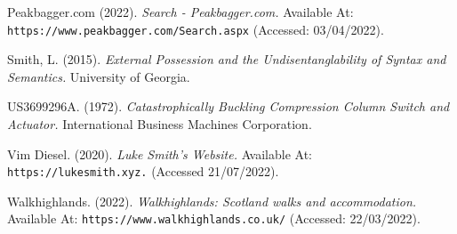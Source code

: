 \documentclass[11pt, english]{article}
\begin{document}
\begin{thebibliography}{9}
	\bibitem{}
		Peakbagger.com (2022).
		\textsl{Search - Peakbagger.com.}
		Available At:
		\texttt{https://www.peakbagger.com/Search.aspx}
		(Accessed: 03/04/2022).

	\bibitem{}
		Smith, L. (2015).
		\textsl{External Possession and the Undisentanglability of Syntax and Semantics.}
		University of Georgia.

	\bibitem{}
		US3699296A. (1972).
		\textsl{Catastrophically Buckling Compression Column Switch and Actuator.}
		International Business Machines Corporation.

	\bibitem{}
		Vim Diesel. (2020).
		\textsl{Luke Smith's Website.}
		Available At:
		\texttt{https://lukesmith.xyz.}
		(Accessed 21/07/2022).

	\bibitem{}
		Walkhighlands. (2022).
		\textsl{Walkhighlands: Scotland walks and accommodation.}
		Available At:
		\texttt{https://www.walkhighlands.co.uk/}
		(Accessed: 22/03/2022).

	\end{thebibliography}
\end{document}
